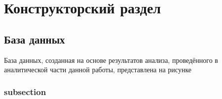 \chapter{Конструкторский раздел}
\section{База данных}
База данных, созданная на основе результатов анализа, проведённого в аналитической части данной работы, представлена на рисунке 
\subsection{subsection}

